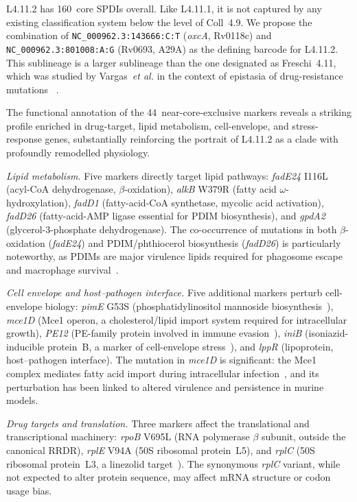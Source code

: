 \documentclass[11pt,a4paper]{article}
\newcommand{\spdi}[1]{\texttt{#1}}
\newcommand{\lignee}[1]{\textsf{#1}}
\begin{document}
\lignee{L4.11.2} has 160~core SPDIs overall.  Like \lignee{L4.11.1}, it is
not captured by any existing classification system below the level of
Coll~4.9.  We propose the combination of \spdi{NC\_000962.3:143666:C:T}
(\textit{oxcA}, Rv0118c) and \spdi{NC\_000962.3:801008:A:G}
(Rv0693, A29A) as the defining barcode for
\lignee{L4.11.2}.  This sublineage is a larger sublineage than the one designated
as Freschi~4.11, which was studied by Vargas~\textit{et al.} in the
context of epistasia of drug-resistance mutations ~\cite{vargas2023}.

The functional annotation of the 44~near-core-exclusive markers reveals a
striking profile enriched in drug-target, lipid metabolism, cell-envelope,
and stress-response genes, substantially reinforcing the portrait of
\lignee{L4.11.2} as a clade with profoundly remodelled physiology.

\textit{Lipid metabolism.}  Five markers directly target lipid pathways:
\textit{fadE24} I116L (acyl-CoA dehydrogenase, $\beta$-oxidation)\cite{ramaswamy2003},
\textit{alkB} W379R (fatty acid $\omega$-hydroxylation),
\textit{fadD1} (fatty-acid-CoA synthetase, mycolic acid activation),
\textit{fadD26} (fatty-acid-AMP ligase essential for PDIM biosynthesis),
and \textit{gpdA2} (glycerol-3-phosphate dehydrogenase).
The co-occurrence of mutations in both $\beta$-oxidation (\textit{fadE24})
and PDIM/phthiocerol biosynthesis (\textit{fadD26}) is particularly
noteworthy, as PDIMs are major virulence lipids required for phagosome
escape and macrophage survival~\cite{lerner2018,rens2021}.

\textit{Cell envelope and host--pathogen interface.}  Five additional
markers perturb cell-envelope biology:
\textit{pimE} G53S (phosphatidylinositol mannoside biosynthesis~\cite{liu2025pimE}),
\textit{mce1D} (Mce1 operon, a cholesterol/lipid import system required
for intracellular growth),
\textit{PE12} (PE-family protein involved in immune evasion~\cite{sharma2022}),
\textit{iniB} (isoniazid-inducible protein~B, a marker of
cell-envelope stress~\cite{boot2017}), and
\textit{lppR} (lipoprotein, host--pathogen interface).
The mutation in \textit{mce1D} is significant: the Mce1 complex
mediates fatty acid import during intracellular infection~\cite{forrellad2014}, and its
perturbation has been linked to altered virulence and persistence
in murine models.

\textit{Drug targets and translation.}  Three markers affect the
translational and transcriptional machinery:
\textit{rpoB} V695L (RNA polymerase $\beta$ subunit, outside
the canonical RRDR),
\textit{rplE} V94A (50S ribosomal protein~L5), and
\textit{rplC} (50S ribosomal protein~L3, a linezolid target~\cite{beckert2012}).
The synonymous \textit{rplC} variant, while not expected to alter
protein sequence, may affect mRNA structure or codon usage bias.
\end{document}
